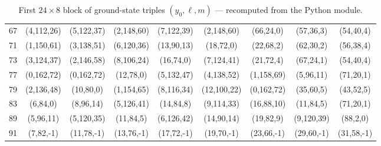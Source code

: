 \documentclass[11pt,a4paper]{article}
\begin{document}
\begin{table}[htbp]
\begin{tabular}{c|cccccccc}
67 & (4,112,26) & (5,122,37) & (2,148,60) & (7,122,39) & (2,148,60) & (66,24,0) & (57,36,3) & (54,40,4) \\
71 & (1,150,61) & (3,138,51) & (6,120,36) & (13,90,13) & (18,72,0) & (22,68,2) & (62,30,2) & (56,38,4) \\
73 & (3,124,37) & (2,146,58) & (8,106,24) & (16,74,0) & (7,124,41) & (21,72,4) & (67,24,1) & (54,40,4) \\
77 & (0,162,72) & (0,162,72) & (12,78,0) & (5,132,47) & (4,138,52) & (1,158,69) & (5,96,11) & (71,20,1) \\
79 & (2,136,48) & (10,80,0) & (1,154,65) & (8,116,34) & (12,100,22) & (0,162,72) & (35,60,5) & (43,52,5) \\
83 & (6,84,0) & (8,96,14) & (5,126,41) & (14,84,8) & (9,114,33) & (16,88,10) & (11,84,5) & (71,20,1) \\
89 & (5,96,11) & (5,120,35) & (11,84,5) & (6,126,42) & (14,90,14) & (19,82,9) & (9,120,39) & (88,2,0) \\
91 & (7,82,-1) & (11,78,-1) & (13,76,-1) & (17,72,-1) & (19,70,-1) & (23,66,-1) & (29,60,-1) & (31,58,-1) \\
\end{tabular}
\caption{First \(24 \times 8\) block of ground-state triples \((y_0, \ell, m)\) — recomputed from the Python module.}
\label{tab:ym-block1-recomputed}
\end{table}
\end{document}
